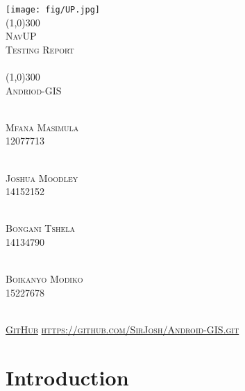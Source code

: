 \documentclass[runningheads,a4paper]{article}
\begin{document}
	\begin{titlepage}
		\begin{center}
			\texttt{[image: fig/UP.jpg]}  \\
			[1cm]
			\line(1,0){300} \\
			[0.3cm]
			\textsc{\Large
				NavUP\\
				Testing Report\\
			\hfill
			}\\
			[0.1cm]
			\line(1,0){300} \\
			[0.7cm]
			\textsc{\Large
				Andriod-GIS
			} \\
		\end{center}
		
		\begin{center}
			\begin{multicols}{2}
				\textsc{\large\\
				Mfana Masimula\\ 
					12077713\\ 
				}
				
				\textsc{\large\\
				Joshua Moodley\\
					 14152152\\ 
				}
				
			\textsc{\large\\
				Bongani Tshela\\ 
				14134790\\ 
			}
			
			\textsc{\large\\
				Boikanyo Modiko\\
				15227678\\ 
			}
		
			\end{multicols}
			
			
			\textsc{\\ \href{https://github.com/SirJosh/Android-GIS}{GitHub}
				\url{https://github.com/SirJosh/Android-GIS.git}}
		\end{center}
	\end{titlepage}

\begingroup

\tableofcontents
{}
\endgroup
\newpage

\section{Introduction}
\end{document}
